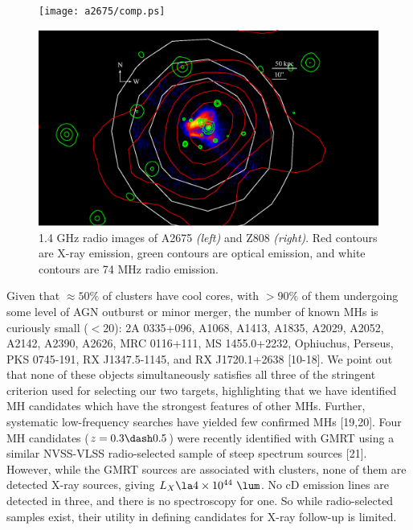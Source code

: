 \documentclass[letterpaper,11pt]{article}
\begin{document}
\begin{figure}[ht]
  \begin{center}
    \begin{minipage}{0.495\columnwidth}
      \texttt{[image: a2675/comp.ps]}
    \end{minipage}
    \begin{minipage}{0.495\columnwidth}
      \includegraphics*[width=\columnwidth, trim=42mm 15mm 45mm 15mm, clip]{zw808/comp.ps}
    \end{minipage}
    \caption{1.4 GHz radio images of A2675 {\it{(left)}} and Z808
      {\it{(right)}}. Red contours are X-ray emission, green
      contours are optical emission, and white contours are 74 MHz
      radio emission.}
    \label{fig:img}
  \end{center}
  \vspace{-22pt}
\end{figure}

Given that $\approx50\%$ of clusters have cool cores, with $> 90\%$ of
them undergoing some level of AGN outburst or minor merger, the number
of known MHs is curiously small ($< 20$): 2A 0335+096, A1068, A1413,
A1835, A2029, A2052, A2142, A2390, A2626, MRC 0116+111, MS
1455.0+2232, Ophiuchus, Perseus, PKS 0745-191, RX J1347.5-1145, and RX
J1720.1+2638 [10-18]. We point out that none of these objects
simultaneously satisfies all three of the stringent criterion used for
selecting our two targets, highlighting that we have identified MH
candidates which have the strongest features of other MHs. Further,
systematic low-frequency searches have yielded few confirmed MHs
[19,20]. Four MH candidates ($z=0.3 \dash 0.5$) were recently
identified with GMRT using a similar NVSS-VLSS radio-selected sample
of steep spectrum sources [21]. However, while the GMRT sources are
associated with clusters, none of them are detected X-ray sources,
giving $L_X \la 4 \times 10^{44} ~\lum$. No cD emission lines are
detected in three, and there is no spectroscopy for one. So while
radio-selected samples exist, their utility in defining candidates for
X-ray follow-up is limited.
\end{document}
